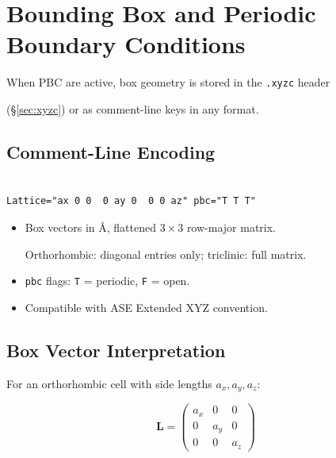 \documentclass[12pt, a4paper, oneside]{article}
\begin{document}

\section{Bounding Box and Periodic Boundary Conditions}

\label{sec:pbc}



When PBC are active, box geometry is stored in the \texttt{.xyzc} header

(\S\ref{sec:xyzc}) or as comment-line keys in any format.


\subsection{Comment-Line Encoding}


\begin{lstlisting}[language={},frame=single]

Lattice="ax 0 0  0 ay 0  0 0 az" pbc="T T T"

\end{lstlisting}


\begin{itemize}

  \item Box vectors in \AA, flattened $3\times 3$ row-major matrix.

        Orthorhombic: diagonal entries only; triclinic: full matrix.

  \item \texttt{pbc} flags: \texttt{T} = periodic, \texttt{F} = open.

  \item Compatible with ASE Extended XYZ convention.

\end{itemize}


\subsection{Box Vector Interpretation}


For an orthorhombic cell with side lengths $a_x, a_y, a_z$:

\begin{equation}

  \mathbf{L} =

  \begin{pmatrix}

    a_x & 0   & 0   \\

    0   & a_y & 0   \\

    0   & 0   & a_z

  \end{pmatrix}

  \label{eq:lattice}

\end{equation}
\end{document}
